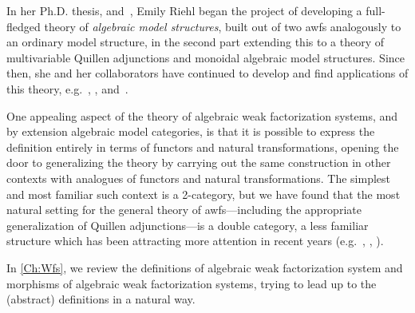In her Ph.D. thesis, \cite{riehl:nwfs-model} and~\cite{riehl:nwfs-monoidal}, Emily Riehl began the project of developing a full-fledged theory of \emph{algebraic model structures}, built out of two awfs analogously to an ordinary model structure, in the second part extending this to a theory of multivariable Quillen adjunctions and monoidal algebraic model structures. Since then, she and her collaborators have continued to develop and find applications of this theory, e.g.~\cite{cgr:mates}, \cite{br:funct-facts}, and~\cite{bmr:six}.

One appealing aspect of the theory of algebraic weak factorization systems, and by extension algebraic model categories, is that it is possible to express the definition entirely in terms of functors and natural transformations, opening the door to generalizing the theory by carrying out the same construction in other contexts with analogues of functors and natural transformations. The simplest and most familiar such context is a 2-category, but we have found that the most natural setting for the general theory of awfs---including the appropriate generalization of Quillen adjunctions---is a double category, a less familiar structure which has been attracting more attention in recent years (e.g.~\cite{shulman:framed}, \cite{dpp:spans}, \cite{fiore:monads}).


In \cref{Ch:Wfs}, we review the definitions of algebraic weak factorization system and morphisms of algebraic weak factorization systems, trying to lead up to the (abstract) definitions in a natural way.

